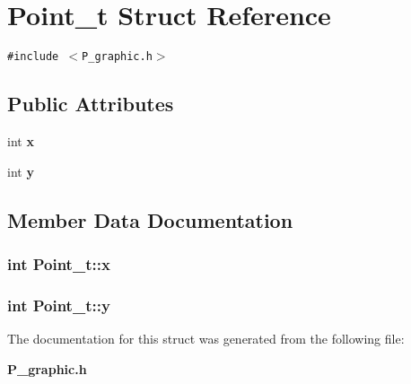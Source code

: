 \section{Point\_\-t  Struct Reference}
\label{structPoint__t}
{\tt \#include $<$P\_\-graphic.h$>$}

\subsection*{Public Attributes}
\begin{CompactItemize}
\item 
int {\bf x}
\item 
int {\bf y}
\end{CompactItemize}


\subsection{Member Data Documentation}
\subsubsection{\setlength{\rightskip}{0pt plus 5cm}int Point\_\-t::x}\label{structPoint__t_m0}


\subsubsection{\setlength{\rightskip}{0pt plus 5cm}int Point\_\-t::y}\label{structPoint__t_m1}




The documentation for this struct was generated from the following file:\begin{CompactItemize}
\item 
{\bf P\_\-graphic.h}\end{CompactItemize}
